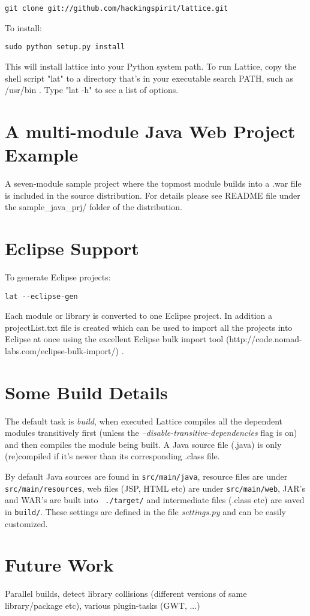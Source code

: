 \documentclass[12pt]{article}
\begin{document}
\begin{verbatim}
git clone git://github.com/hackingspirit/lattice.git
\end{verbatim}


To install:
\begin{verbatim}
sudo python setup.py install
\end{verbatim}
This will install lattice into your Python system path. 
To run Lattice, copy the shell script "lat"  to a directory that's in your executable search PATH, such as /usr/bin .   Type "lat -h" to see a list of options.

\section{A multi-module Java Web Project Example}
A seven-module sample project where the topmost module builds into a .war
file is included in the source distribution. For details 
please see README file under the sample\_java\_prj/ folder of the distribution.

\section{Eclipse Support}
To generate Eclipse projects:
\begin{verbatim}
lat --eclipse-gen 
\end{verbatim}

Each module or library is converted to one Eclipse project.  In
addition a projectList.txt file is created which can be used to import
all the projects into Eclipse at once using the
excellent Eclipse bulk import tool
(http://code.nomad-labs.com/eclipse-bulk-import/) .


\section{Some Build Details}
The default task is {\it build}, when executed Lattice compiles all the dependent
modules transitively first (unless the {\it
  --disable-transitive-dependencies} flag is on) and then compiles the
module being built. A Java source file (.java) is only (re)compiled if
it's newer than its corresponding .class file.  

By default Java sources are found in {\tt src/main/java}, resource
files are under {\tt src/main/resources}, web files (JSP, HTML etc)
are under {\tt src/main/web}, JAR's and WAR's are built into {\tt
  ./target/} and intermediate files (.class etc) are saved in {\tt build/}.  
These settings are defined in the file {\it settings.py} and can be easily customized.



\section{Future Work}

Parallel builds, detect library collisions (different versions of same
library/package etc), various plugin-tasks (GWT, ...)
\end{document}

